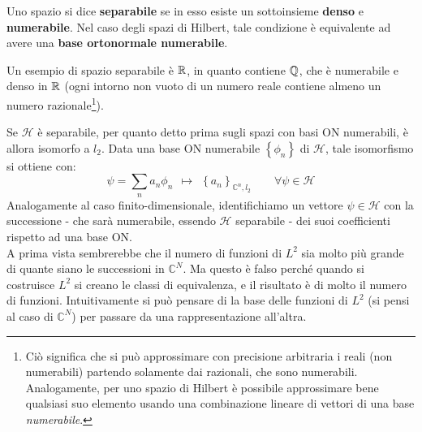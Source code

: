 \documentclass[FisicaTeorica.tex]{subfiles}
\begin{document}
\begin{dfn}
Uno spazio si dice \textbf{separabile}  se in esso esiste un sottoinsieme \textbf{denso} e \textbf{numerabile}. Nel caso degli spazi di Hilbert, tale condizione è equivalente ad avere una \textbf{base ortonormale numerabile}.\\
\end{dfn}
\begin{expl}
Un esempio di spazio separabile è $\mathbb{R}$, in quanto contiene $\mathbb{Q}$, che è numerabile e denso in $\mathbb{R}$ (ogni intorno non vuoto di un numero reale contiene almeno un numero razionale\footnote{Ciò significa che si può approssimare con precisione arbitraria i reali (non numerabili) partendo solamente dai razionali, che sono numerabili. Analogamente, per uno spazio di Hilbert è possibile approssimare bene qualsiasi suo elemento usando una combinazione lineare di vettori di una base \textit{numerabile}.}).
\end{expl}
Se $\mathcal{H}$ è separabile, per quanto detto prima sugli spazi con basi ON numerabili, è allora isomorfo a $l_2$.  Data una base ON numerabile $\left\{\phi_n\right\}$ di $\mathcal{H}$, tale isomorfismo si ottiene con:
\[
\psi = \sum_{n}{a_n\phi_n} \ \ \mapsto \ \ \left\{a_n\right\}_{\mathbb{C}^n,l_2} \qquad \forall \psi \in \mathcal{H}
\]
Analogamente al caso finito-dimensionale, identifichiamo un vettore $\psi \in \mathcal{H}$ con la successione - che sarà numerabile, essendo $\mathcal{H}$ separabile - dei suoi coefficienti rispetto ad una base ON.\\

A prima vista sembrerebbe che il numero di funzioni di $L^2$ sia molto più grande di quante siano le successioni in ${\mathbb C^N}$. Ma questo è falso perché quando si costruisce $L^2$ si creano le classi di equivalenza, e il risultato è  di molto il numero di funzioni. Intuitivamente si può pensare di  la base delle funzioni di $L^2$ (si pensi al caso di ${\mathbb C}^N$) per passare da una rappresentazione all'altra. \\
\end{document}

